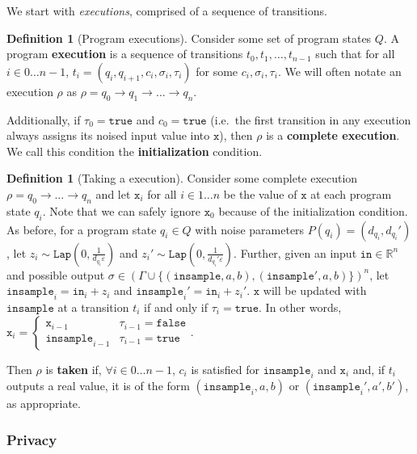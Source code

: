 \documentclass[12pt]{article}
\newcommand{\RR}{\mathbb{R}}
\newcommand{\Lap}{\texttt{Lap}}
\theoremstyle{definition}
\newtheorem{defn}[thm]{Definition}
\begin{document}
We start with \textit{executions}, comprised of a sequence of transitions. 

\begin{defn}[Program executions]
    Consider some set of program states $Q$. A program \textbf{execution} is a sequence of transitions $t_0, t_1, \ldots, t_{n-1}$ such that for all $i\in 0\ldots n-1$, $t_i = (q_i, q_{i+1}, c_i, \sigma_i, \tau_i)$ for some $c_i, \sigma_i, \tau_i$. We will often notate an execution $\rho$ as $\rho = q_0\to q_1\to \ldots \to q_n$. 
    
    Additionally, if $\tau_0 = \texttt{true}$ and $c_0 = \texttt{true}$ (i.e.\ the first transition in any execution always assigns its noised input value into $\texttt{x}$), then $\rho$ is a \textbf{complete execution}. We call this condition the \textbf{initialization} condition.
\end{defn}
\begin{defn}[Taking a execution]
    Consider some complete execution $\rho = q_0\to \ldots \to q_n$ and let $\texttt{x}_i$ for all $i\in 1\ldots n$ be the value of $\texttt{x}$ at each program state $q_i$. Note that we can safely ignore $\texttt{x}_0$ because of the initialization condition. As before, for a program state $q_i\in Q$ with noise parameters $P({q_i}) = (d_{q_i}, d_{q_i}')$, let $z_i\sim \Lap(0, \frac{1}{d_{q_i}\varepsilon})$ and $z_i'\sim\Lap(0, \frac{1}{d_{q_i}'\varepsilon})$. 
    Further, given an input $\texttt{in}\in \RR^n$ and possible output $\sigma \in (\Gamma\cup\{(\texttt{insample}, a, b), (\texttt{insample}', a, b)\})^n$, let $\texttt{insample}_i = \texttt{in}_i+z_i$ and $\texttt{insample}_i' = \texttt{in}_i+z_i'$. $\texttt{x}$ will be updated with $\texttt{insample}$ at a transition $t_i$ if and only if $\tau_i = \texttt{true}$. In other words, $\texttt{x}_i = \begin{cases}
        \texttt{x}_{i-1} & \tau_{i-1} =\texttt{false}\\
        \texttt{insample}_{i-1} &\tau_{i-1}=\texttt{true}
    \end{cases}$. 

    Then $\rho$ is \textbf{taken} if, $\forall i\in 0\ldots n-1$, $c_i$ is satisfied for $\texttt{insample}_i$ and $\texttt{x}_i$ and, if $t_i$ outputs a real value, it is of the form $(\texttt{insample}_i, a, b)$ or $(\texttt{insample}_i', a', b')$, as appropriate. 
\end{defn}

\subsubsection{Privacy}
\end{document}
